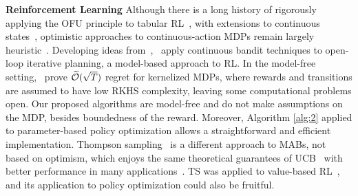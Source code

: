 \documentclass{article}
\begin{document}
\textbf{Reinforcement Learning} Although there is a long history of rigorously applying the OFU principle to tabular RL~\citep{kearns2002near,brafman2002r,strehl2009reinforcement,jaksch2010near,lattimore2014near,dann2015sample,dann2017unifying,jin2018q,jungseul2018exploration}, with extensions to continuous states~\citep{ortner2012online,lakshmanan2015improved,bellemare2016unifying}, optimistic approaches to continuous-action MDPs
remain largely heuristic~\cite{houthooft2016vime,haarnoja2017reinforcement,haarnoja2018soft}. Developing ideas from~\citet{bubeck2010open},~\citet{weinstein2012bandit} apply continuous bandit techniques to open-loop iterative planning, a model-based approach to RL. In the model-free setting,~\citet{sayak2018online} prove $\widetilde{\mathcal{O}}(\sqrt{T})$ regret for kernelized MDPs, where rewards and transitions are assumed to have low RKHS complexity, leaving some computational problems open. Our proposed algorithms are model-free and do not make assumptions on the MDP, besides boundedness of the reward. Moreover, Algorithm \ref{alg:2} applied to parameter-based policy optimization allows a straightforward and efficient implementation.
Thompson sampling~\citep[TS,][]{thompson1933likelihood} is a different approach to MABs, not based on optimism, which enjoys the same theoretical guarantees of UCB~\citep{kaufmann2012thompson} with better performance in many applications~\citep{chapelle2011empirical}. TS was applied to value-based RL~\citep[\eg][]{osband2013more}, and its application to policy optimization could also be fruitful.
\end{document}

